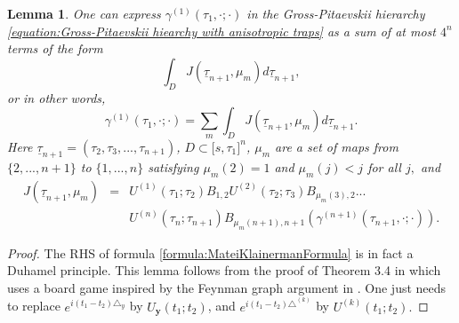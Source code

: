 \documentclass[reqno]{amsart}
\theoremstyle{plain}
\newtheorem{lemma}{Lemma}
\numberwithin{equation}{section}
\begin{document}
\begin{lemma}
\label{lemma:MateiLemma}One can express $\gamma ^{(1)}(\tau _{1},\mathbf{\cdot };\mathbf{\cdot })$ in the Gross-Pitaevskii hierarchy \ref{equation:Gross-Pitaevskii hiearchy with anisotropic traps} as a sum of at
most $4^{n}$ terms of the form 
\begin{equation*}
\int_{D}J(\underline{\tau }_{n+1},\mu _{m})d\underline{\tau }_{n+1},
\end{equation*}or in other words, 
\begin{equation}
\gamma ^{(1)}(\tau _{1},\mathbf{\cdot };\mathbf{\cdot })=\sum_{m}\int_{D}J(\underline{\tau }_{n+1},\mu _{m})d\underline{\tau }_{n+1}.
\label{formula:MateiKlainermanFormula}
\end{equation}Here $\underline{\tau }_{n+1}=(\tau _{2},\tau _{3},...,\tau _{n+1})$, $D\subset \lbrack s,\tau _{1}]^{n}$, $\mu _{m}$ are a set of maps from $\{2,...,n+1\}$ to $\{1,...,n\}$ satisfying $\mu _{m}(2)=1$ and $\mu
_{m}(j)<j $ for all $j,$ and\begin{eqnarray*}
J(\underline{\tau }_{n+1},\mu _{m}) &=&U^{(1)}(\tau _{1};\tau
_{2})B_{1,2}U^{(2)}(\tau _{2};\tau _{3})B_{\mu _{m}(3),2}... \\
&&U^{(n)}(\tau _{n};\tau _{n+1})B_{\mu _{m}(n+1),n+1}(\gamma ^{(n+1)}(\tau
_{n+1},\mathbf{\cdot };\mathbf{\cdot })).
\end{eqnarray*}
\end{lemma}

\begin{proof}
The RHS of formula \ref{formula:MateiKlainermanFormula} is in fact a Duhamel
principle. This lemma follows from the proof of Theorem 3.4 in \cite{KlainermanAndMachedon} which uses a board game inspired by the Feynman
graph argument in \cite{E-S-Y2}. One just needs to replace $e^{i(t_{1}-t_{2})\triangle _{y}}$ by $U_{\mathbf{y}}(t_{1};t_{2})$, and $e^{i(t_{1}-t_{2})\triangle ^{(k)}}$ by $U^{(k)}(t_{1};t_{2}).$
\end{proof}
\end{document}
